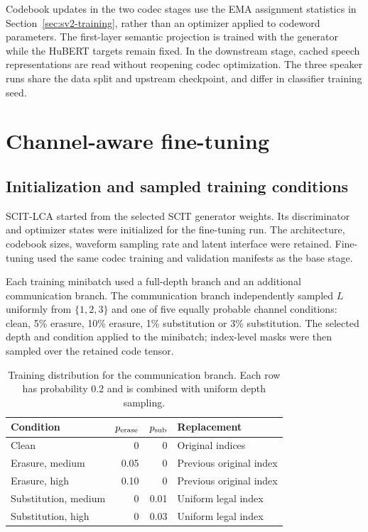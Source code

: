 Codebook updates in the two codec stages use the EMA assignment statistics in Section~\ref{sec:sv2-training}, rather than an optimizer applied to codeword parameters. The first-layer semantic projection is trained with the generator while the HuBERT targets remain fixed. In the downstream stage, cached speech representations are read without reopening codec optimization. The three speaker runs share the data split and upstream checkpoint, and differ in classifier training seed.

\section{Channel-aware fine-tuning}
\label{sec:sv2-lca}

\subsection{Initialization and sampled training conditions}
SCIT-LCA started from the selected SCIT generator weights. Its discriminator and optimizer states were initialized for the fine-tuning run. The architecture, codebook sizes, waveform sampling rate and latent interface were retained. Fine-tuning used the same codec training and validation manifests as the base stage.

Each training minibatch used a full-depth branch and an additional communication branch. The communication branch independently sampled $L$ uniformly from $\{1,2,3\}$ and one of five equally probable channel conditions: clean, 5\% erasure, 10\% erasure, 1\% substitution or 3\% substitution. The selected depth and condition applied to the minibatch; index-level masks were then sampled over the retained code tensor.

\begin{table}[t]
\centering
\caption{Training distribution for the communication branch. Each row has probability 0.2 and is combined with uniform depth sampling.}
\label{tab:sv2-lca-conditions}
\small
\begin{tabularx}{\columnwidth}{@{}lrrY@{}}
\toprule
Condition & $p_{\rm erase}$ & $p_{\rm sub}$ & Replacement\\
\midrule
Clean & 0 & 0 & Original indices\\
Erasure, medium & 0.05 & 0 & Previous original index\\
Erasure, high & 0.10 & 0 & Previous original index\\
Substitution, medium & 0 & 0.01 & Uniform legal index\\
Substitution, high & 0 & 0.03 & Uniform legal index\\
\bottomrule
\end{tabularx}
\end{table}


